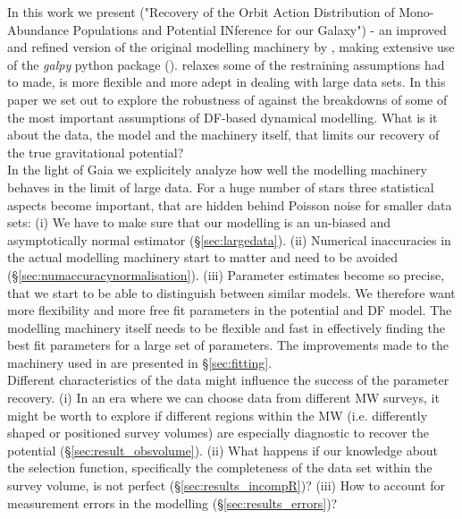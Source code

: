In this work we present \RM ("\textsc{R}ecovery of the \textsc{O}rbit \textsc{A}ction \textsc{D}istribution of \textsc{M}ono-\textsc{A}bundance \textsc{P}opulations and \textsc{P}otential \textsc{IN}ference for our \textsc{G}alaxy") - an improved and refined version of the original modelling machinery by \cite{bov13}, making extensive use of the \emph{galpy} python package (\cite{bov15}). \RM relaxes some of the restraining assumptions \cite{bov13} had to made, is more flexible and more adept in dealing with large data sets. In this paper we set out to explore the robustness of \RM against the breakdowns of some of the most important assumptions of DF-based dynamical modelling. What is it about the data, the model and the machinery itself, that limits our recovery of the true gravitational potential? \\

In the light of Gaia we explicitely analyze how well the modelling machinery behaves in the limit of large data. For a huge number of stars three statistical aspects become important, that are  hidden behind Poisson noise for smaller data sets: (i) We have to make sure that our modelling is an un-biased and asymptotically normal estimator (\S\ref{sec:largedata}). (ii) Numerical inaccuracies in the actual modelling machinery start to matter and need to be avoided (\S\ref{sec:numaccuracynormalisation}). (iii) Parameter estimates become so precise, that we start to be able to distinguish between similar models. We therefore want more flexibility and more free fit parameters in the potential and DF model. The modelling machinery itself needs to be flexible and fast in effectively finding the best fit parameters for a large set of parameters. The improvements made to the machinery used in \cite{bov13} are presented in \S\ref{sec:fitting}. \\

Different characteristics of the data might influence the success of the parameter recovery. (i) In an era where we can choose data from different MW surveys, it might be worth to explore if different regions within the MW (i.e. differently shaped or positioned survey volumes) are especially diagnostic to recover the potential (\S\ref{sec:result_obsvolume}). (ii) What happens if our knowledge about the selection function, specifically the completeness of the data set within the survey volume, is not perfect (\S\ref{sec:results_incompR})? (iii) How to account for measurement errors in the modelling (\S\ref{sec:results_errors})? \\

